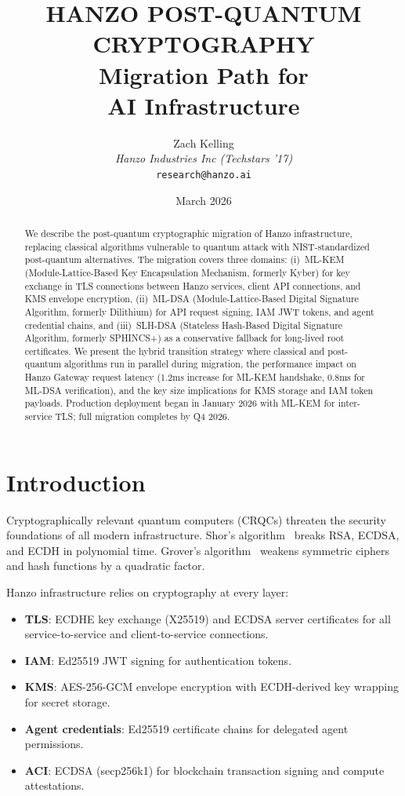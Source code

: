 \documentclass[11pt]{article}
\title{HANZO POST-QUANTUM CRYPTOGRAPHY\\[0.3em]
{\large Migration Path for\\AI Infrastructure}}
\author{
    Zach Kelling \\
    \textit{Hanzo Industries Inc (Techstars '17)} \\
    \texttt{research@hanzo.ai}
}
\date{March 2026}
\begin{document}
\hanzocoverpage

\begin{abstract}
We describe the post-quantum cryptographic migration of Hanzo infrastructure,
replacing classical algorithms vulnerable to quantum attack with NIST-standardized
post-quantum alternatives. The migration covers three domains: (i)~ML-KEM
(Module-Lattice-Based Key Encapsulation Mechanism, formerly Kyber) for key
exchange in TLS connections between Hanzo services, client API connections, and
KMS envelope encryption, (ii)~ML-DSA (Module-Lattice-Based Digital Signature
Algorithm, formerly Dilithium) for API request signing, IAM JWT tokens, and
agent credential chains, and (iii)~SLH-DSA (Stateless Hash-Based Digital
Signature Algorithm, formerly SPHINCS+) as a conservative fallback for
long-lived root certificates. We present the hybrid transition strategy where
classical and post-quantum algorithms run in parallel during migration, the
performance impact on Hanzo Gateway request latency (1.2ms increase for ML-KEM
handshake, 0.8ms for ML-DSA verification), and the key size implications for
KMS storage and IAM token payloads. Production deployment began in January 2026
with ML-KEM for inter-service TLS; full migration completes by Q4 2026.
\end{abstract}

\section{Introduction}
\label{sec:intro}

Cryptographically relevant quantum computers (CRQCs) threaten the security
foundations of all modern infrastructure. Shor's algorithm~\cite{shor1994}
breaks RSA, ECDSA, and ECDH in polynomial time. Grover's
algorithm~\cite{grover1996} weakens symmetric ciphers and hash functions by a
quadratic factor.

Hanzo infrastructure relies on cryptography at every layer:
\begin{itemize}[leftmargin=1.1em]
    \item \textbf{TLS}: ECDHE key exchange (X25519) and ECDSA server
    certificates for all service-to-service and client-to-service connections.
    \item \textbf{IAM}: Ed25519 JWT signing for authentication tokens.
    \item \textbf{KMS}: AES-256-GCM envelope encryption with ECDH-derived
    key wrapping for secret storage.
    \item \textbf{Agent credentials}: Ed25519 certificate chains for delegated
    agent permissions.
    \item \textbf{ACI}: ECDSA (secp256k1) for blockchain transaction signing
    and compute attestations.
\end{itemize}
\end{document}
